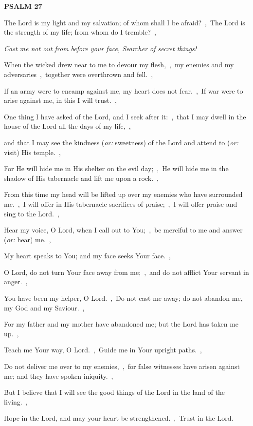 \documentclass[12pt,twoside,a5paper]{article}
\newcommand{\psalm}[1]{\textbf{PSALM {#1}}\nopagebreak}
\newcommand{\qanona}[1]{{\liturgicalhint{Qanona.} \emph{#1}}}
\newcommand{\translationoption}[1]{\emph{or:} #1}
\begin{document}
\psalm{27}

\begin{normalparskip}
  The Lord is my light and my salvation; of whom shall I be afraid?~\sep\ The Lord is the strength of my life; from whom do I tremble?~\sep

  \qanona{Cast me not out from before your face, Searcher of secret things!}

  When the wicked drew near to me to devour my flesh,~\sep\ my enemies and my adversaries~\sep\ together were overthrown and fell.~\sep

  If an army were to encamp against me, my heart does not fear.~\sep\ If war were to arise against me, in this I will trust.~\sep

  One thing I have asked of the Lord, and I seek after it:~\sep\ that I may dwell in the house of the Lord all the days of my life,~\sep

  and that I may see the kindness (\translationoption{sweetness}) of the Lord and attend to (\translationoption{visit}) His temple.~\sep

  For He will hide me in His shelter on the evil day;~\sep\ He will hide me in the shadow of His tabernacle and lift me upon a rock.~\sep

  From this time my head will be lifted up over my enemies who have surrounded me.~\sep\ I will offer in His tabernacle sacrifices of praise;~\sep\ I will offer praise and sing to the Lord.~\sep

  Hear my voice, O Lord, when I call out to You;~\sep\ be merciful to me and answer (\translationoption{hear}) me.~\sep

  My heart speaks to You; and my face seeks Your face.~\sep

  O Lord, do not turn Your face away from me;~\sep\ and do not afflict Your servant in anger.~\sep

  You have been my helper, O Lord.~\sep\ Do not cast me away; do not abandon me, my God and my Saviour.~\sep

  For my father and my mother have abandoned me; but the Lord has taken me up.~\sep

  Teach me Your way, O Lord.~\sep\ Guide me in Your upright paths.~\sep

  Do not deliver me over to my enemies,~\sep\ for false witnesses have arisen against me; and they have spoken iniquity.~\sep

  But I believe that I will see the good things of the Lord in the land of the living.~\sep

  Hope in the Lord, and may your heart be strengthened.~\sep\ Trust in the Lord.
\end{normalparskip}
\end{document}
